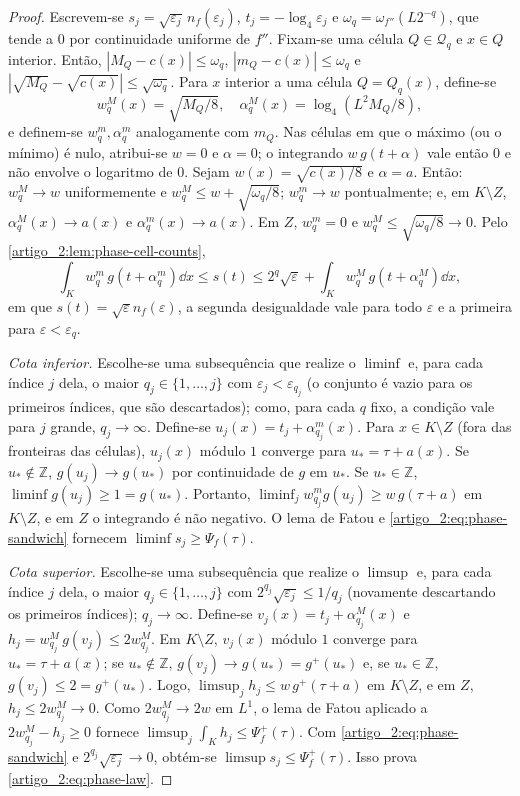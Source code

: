 \begin{proof}
Escrevem-se $s_j=\sqrt{\varepsilon_j}\,n_f(\varepsilon_j)$, $t_j=-\log_4\varepsilon_j$ e
$\omega_q=\omega_{f''}(L2^{-q})$, que tende a $0$ por continuidade uniforme de
$f''$. Fixam-se uma célula $Q\in\mathcal Q_q$ e $x\in Q$ interior. Então,
$|M_Q-c(x)|\le\omega_q$, $|m_Q-c(x)|\le\omega_q$ e
$|\sqrt{M_Q}-\sqrt{c(x)}|\le\sqrt{\omega_q}$. Para $x$ interior a uma célula
$Q=Q_q(x)$, define-se
\[
 w^M_q(x)=\sqrt{M_Q/8},\quad \alpha^M_q(x)=\log_4(L^2M_Q/8),
\]
e definem-se $w^m_q,\alpha^m_q$ analogamente com $m_Q$. Nas células em que o máximo (ou
o mínimo) é nulo, atribui-se $w=0$ e $\alpha=0$; o integrando $w\,g(t+\alpha)$ vale
então $0$ e não envolve o logaritmo de $0$.
Sejam $w(x)=\sqrt{c(x)/8}$ e $\alpha=a$. Então:
$w^M_q\to w$ uniformemente e $w^M_q\le w+\sqrt{\omega_q/8}$;
$w^m_q\to w$ pontualmente; e, em $K\setminus Z$, $\alpha^M_q(x)\to a(x)$ e
$\alpha^m_q(x)\to a(x)$. Em $Z$, $w^m_q=0$ e $w^M_q\le\sqrt{\omega_q/8}\to0$.
Pelo \cref{artigo_2:lem:phase-cell-counts},
\begin{equation}
 \int_Kw^m_q\,g(t+\alpha^m_q)\dd x\le s(t)\le2^q\sqrt\varepsilon
 +\int_Kw^M_q\,g(t+\alpha^M_q)\dd x,
 \label{artigo_2:eq:phase-sandwich}
\end{equation}
em que $s(t)=\sqrt\varepsilon n_f(\varepsilon)$, a segunda desigualdade vale para
todo $\varepsilon$ e a primeira para $\varepsilon<\varepsilon_q$.

\emph{Cota inferior.} Escolhe-se uma subsequência que realize o $\liminf$ e, para
cada índice $j$ dela, o maior $q_j\in\{1,\dots,j\}$ com $\varepsilon_j<\varepsilon_{q_j}$
(o conjunto é vazio para os primeiros índices, que são descartados);
como, para cada $q$ fixo, a condição vale para $j$ grande, $q_j\to\infty$.
Define-se $u_j(x)=t_j+\alpha^m_{q_j}(x)$. Para $x\in K\setminus Z$ (fora das fronteiras
das células), $u_j(x)$ módulo $1$ converge para $u_*=\tau+a(x)$. Se
$u_*\notin\mathbb Z$, $g(u_j)\to g(u_*)$ por continuidade de $g$ em $u_*$. Se
$u_*\in\mathbb Z$, $\liminf g(u_j)\ge1=g(u_*)$. Portanto,
$\liminf_jw^m_{q_j}g(u_j)\ge w\,g(\tau+a)$ em $K\setminus Z$, e em $Z$ o integrando é
não negativo. O lema de Fatou e \eqref{artigo_2:eq:phase-sandwich} fornecem
$\liminf s_j\ge\Psi_f(\tau)$.

\emph{Cota superior.} Escolhe-se uma subsequência que realize o $\limsup$ e, para
cada índice $j$ dela, o maior $q_j\in\{1,\dots,j\}$ com $2^{q_j}\sqrt{\varepsilon_j}\le1/q_j$
(novamente descartando os primeiros índices); $q_j\to\infty$. Define-se $v_j(x)=t_j+\alpha^M_{q_j}(x)$ e
$h_j=w^M_{q_j}\,g(v_j)\le2w^M_{q_j}$. Em $K\setminus Z$, $v_j(x)$ módulo $1$
converge para $u_*=\tau+a(x)$; se $u_*\notin\mathbb Z$, $g(v_j)\to g(u_*)=g^+(u_*)$ e,
se $u_*\in\mathbb Z$, $g(v_j)\le2=g^+(u_*)$. Logo,
$\limsup_jh_j\le w\,g^+(\tau+a)$ em $K\setminus Z$, e em $Z$, $h_j\le2w^M_{q_j}\to0$.
Como $2w^M_{q_j}\to2w$ em $L^1$, o lema de Fatou aplicado a
$2w^M_{q_j}-h_j\ge0$ fornece $\limsup_j\int_Kh_j\le\Psi_f^+(\tau)$. Com
\eqref{artigo_2:eq:phase-sandwich} e $2^{q_j}\sqrt{\varepsilon_j}\to0$, obtém-se
$\limsup s_j\le\Psi_f^+(\tau)$. Isso prova \eqref{artigo_2:eq:phase-law}.


\end{proof}
